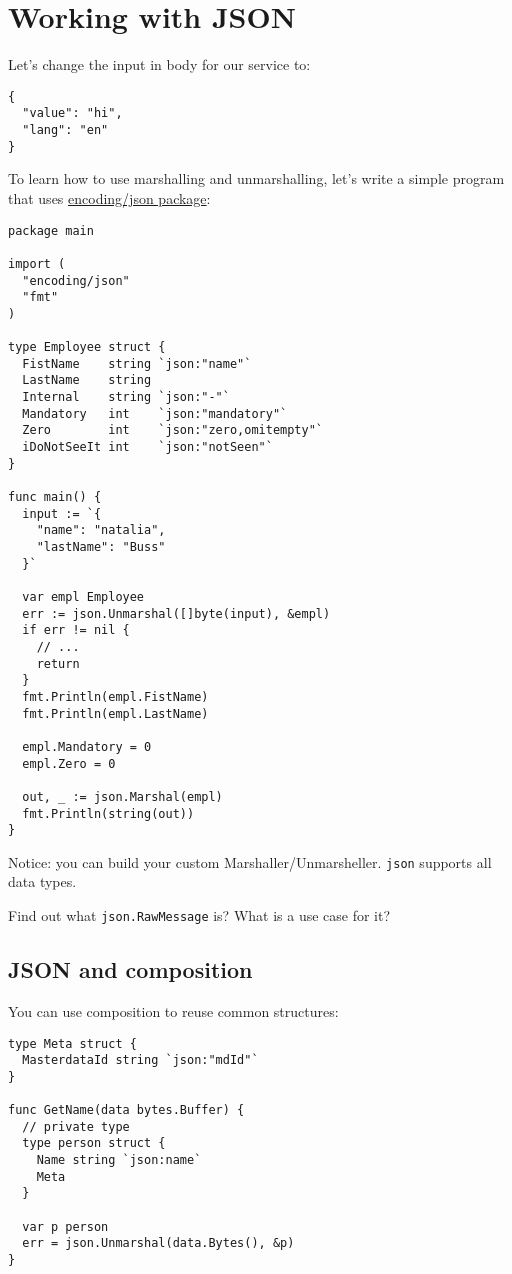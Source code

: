 \documentclass[11pt, letterpaper]{article}
\begin{document}
\section{Working with {\small JSON}}

Let's change the input in body for our service to:

\begin{verbatim}
{
  "value": "hi",
  "lang": "en"
}
\end{verbatim}

To learn how to use marshalling and unmarshalling, let's write a simple program that uses \href{https://golang.org/pkg/encoding/json/}{encoding/json package}:

\begin{verbatim}
package main

import (
  "encoding/json"
  "fmt"
)

type Employee struct {
  FistName    string `json:"name"`
  LastName    string
  Internal    string `json:"-"`
  Mandatory   int    `json:"mandatory"`
  Zero        int    `json:"zero,omitempty"`
  iDoNotSeeIt int    `json:"notSeen"`
}

func main() {
  input := `{
    "name": "natalia",
    "lastName": "Buss"
  }`

  var empl Employee
  err := json.Unmarshal([]byte(input), &empl)
  if err != nil {
    // ...
    return
  }
  fmt.Println(empl.FistName)
  fmt.Println(empl.LastName)

  empl.Mandatory = 0
  empl.Zero = 0

  out, _ := json.Marshal(empl)
  fmt.Println(string(out))
}
\end{verbatim}

Notice: you can build your custom Marshaller/Unmarsheller. \verb|json| supports all data types.

\bigskip

Find out what \verb|json.RawMessage| is? What is a use case for it?

\subsection{{\small JSON} and composition}

You can use composition to reuse common structures:

\begin{verbatim}
type Meta struct {
  MasterdataId string `json:"mdId"`
}

func GetName(data bytes.Buffer) {
  // private type
  type person struct {
    Name string `json:name`
    Meta
  }

  var p person
  err = json.Unmarshal(data.Bytes(), &p)
}
\end{verbatim}
\end{document}

